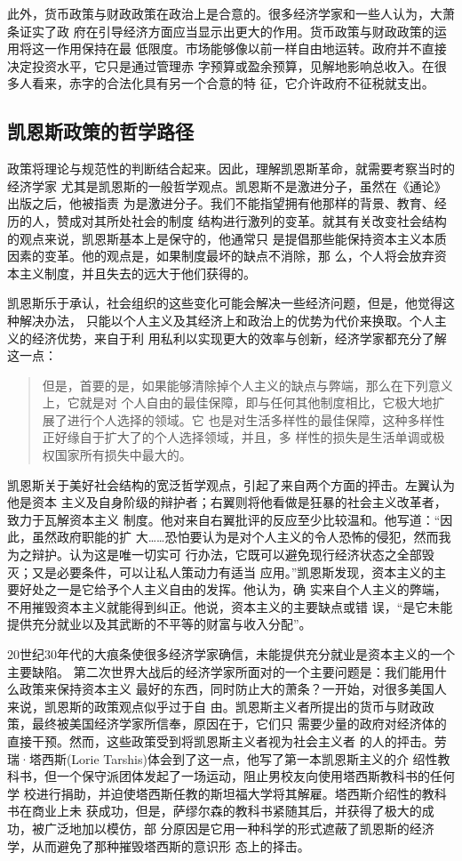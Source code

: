 此外，货币政策与财政政策在政治上是合意的。很多经济学家和一些人认为，大萧条证实了政
府在引导经济方面应当显示出更大的作用。货币政策与财政政策的运用将这一作用保持在最
低限度。市场能够像以前一样自由地运转。政府并不直接决定投资水平，它只是通过管理赤
字预算或盈余预算，见解地影响总收入。在很多人看来，赤字的合法化具有另一个合意的特
征，它介许政府不征税就支出。

\subsection{凯恩斯政策的哲学路径}

政策将理论与规范性的判断结合起来。因此，理解凯恩斯革命，就需要考察当时的经济学家
尤其是凯恩斯的一般哲学观点。凯恩斯不是激进分子，虽然在《通论》出版之后，他被指责
为是激进分子。我们不能指望拥有他那样的背景、教育、经历的人，赞成对其所处社会的制度
结构进行激列的变革。就其有关改变社会结构的观点来说，凯恩斯基本上是保守的，他通常只
是提倡那些能保持资本主义本质因素的变革。他的观点是，如果制度最坏的缺点不消除，那
么，个人将会放弃资本主义制度，并且失去的远大于他们获得的。

凯恩斯乐于承认，社会组织的这些变化可能会解决一些经济问题，但是，他觉得这种解决办法，
只能以个人主义及其经济上和政治上的优势为代价来换取。个人主义的经济优势，来自于利
用私利以实现更大的效率与创新，经济学家都充分了解这一点：

\begin{quotation}
  但是，首要的是，如果能够清除掉个人主义的缺点与弊端，那么在下列意义上，它就是对
  个人自由的最佳保障，即与任何其他制度相比，它极大地扩展了进行个人选择的领域。它
  也是对生活多样性的最佳保障，这种多样性正好缘自于扩大了的个人选择领域，并且，多
  样性的损失是生活单调或极权国家所有损失中最大的。
\end{quotation}

凯恩斯关于美好社会结构的宽泛哲学观点，引起了来自两个方面的抨击。左翼认为他是资本
主义及自身阶级的辩护者；右翼则将他看做是狂暴的社会主义改革者，致力于瓦解资本主义
制度。他对来自右翼批评的反应至少比较温和。他写道：“因此，虽然政府职能的扩
大……恐怕要认为是对个人主义的令人恐怖的侵犯，然而我为之辩护。认为这是唯一切实可
行办法，它既可以避免现行经济状态之全部毁灭；又是必要条件，可以让私人策动力有适当
应用。”凯恩斯发现，资本主义的主要好处之一是它给予个人主义自由的发挥。他认为，确
实来自个人主义的弊端，不用摧毁资本主义就能得到纠正。他说，资本主义的主要缺点或错
误，“是它未能提供充分就业以及其武断的不平等的财富与收入分配”。

20世纪30年代的大痕条使很多经济学家确信，未能提供充分就业是资本主义的一个主要缺陷。
第二次世界大战后的经济学家所面对的一个主要问题是：我们能用什么政策来保持资本主义
最好的东西，同时防止大的萧条？一开始，对很多美国人来说，凯恩斯的政策观点似乎过于自
由。凯恩斯主义者所提出的货币与财政政策，最终被美国经济学家所信奉，原因在于，它们只
需要少量的政府对经济体的直接干预。然而，这些政策受到将凯恩斯主义者视为社会主义者
的人的抨击。劳瑞·塔西斯(Lorie Tarshis)体会到了这一点，他写了第一本凯恩斯主义的介
绍性教科书，但一个保守派团体发起了一场运动，阻止男校友向使用塔西斯教科书的任何学
校进行捐助，并迫使塔西斯任教的斯坦福大学将其解雇。塔西斯介绍性的教科书在商业上未
获成功，但是，萨缪尔森的教科书紧随其后，并获得了极大的成功，被广泛地加以模仿，部
分原因是它用一种科学的形式遮蔽了凯恩斯的经济学，从而避免了那种摧毁塔西斯的意识形
态上的择击。

